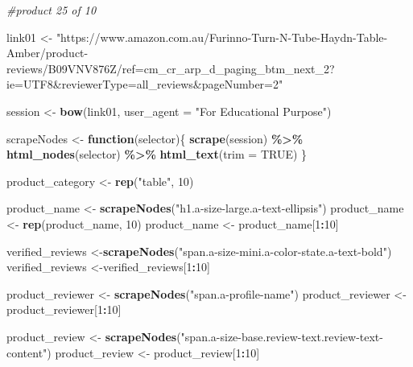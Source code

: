 \documentclass[
]{article}
\newenvironment{Shaded}{\begin{snugshade}}{\end{snugshade}}
\newcommand{\AttributeTok}[1]{\textcolor[rgb]{0.13,0.29,0.53}{#1}}
\newcommand{\CommentTok}[1]{\textcolor[rgb]{0.56,0.35,0.01}{\textit{#1}}}
\newcommand{\ConstantTok}[1]{\textcolor[rgb]{0.56,0.35,0.01}{#1}}
\newcommand{\ControlFlowTok}[1]{\textcolor[rgb]{0.13,0.29,0.53}{\textbf{#1}}}
\newcommand{\DecValTok}[1]{\textcolor[rgb]{0.00,0.00,0.81}{#1}}
\newcommand{\FunctionTok}[1]{\textcolor[rgb]{0.13,0.29,0.53}{\textbf{#1}}}
\newcommand{\NormalTok}[1]{#1}
\newcommand{\OtherTok}[1]{\textcolor[rgb]{0.56,0.35,0.01}{#1}}
\newcommand{\SpecialCharTok}[1]{\textcolor[rgb]{0.81,0.36,0.00}{\textbf{#1}}}
\newcommand{\StringTok}[1]{\textcolor[rgb]{0.31,0.60,0.02}{#1}}
\begin{document}
\begin{Shaded}
\begin{Highlighting}[]
\CommentTok{\#product 25 of 10}

\NormalTok{link01 }\OtherTok{\textless{}{-}} \StringTok{"https://www.amazon.com.au/Furinno{-}Turn{-}N{-}Tube{-}Haydn{-}Table{-}Amber/product{-}reviews/B09VNV876Z/ref=cm\_cr\_arp\_d\_paging\_btm\_next\_2?ie=UTF8\&reviewerType=all\_reviews\&pageNumber=2"}


\NormalTok{  session }\OtherTok{\textless{}{-}} \FunctionTok{bow}\NormalTok{(link01,}
               \AttributeTok{user\_agent =} \StringTok{"For Educational Purpose"}\NormalTok{)}

\NormalTok{  scrapeNodes }\OtherTok{\textless{}{-}} \ControlFlowTok{function}\NormalTok{(selector)\{}
    \FunctionTok{scrape}\NormalTok{(session) }\SpecialCharTok{\%\textgreater{}\%}
      \FunctionTok{html\_nodes}\NormalTok{(selector) }\SpecialCharTok{\%\textgreater{}\%}
      \FunctionTok{html\_text}\NormalTok{(}\AttributeTok{trim =} \ConstantTok{TRUE}\NormalTok{)}
\NormalTok{  \}}

\NormalTok{  product\_category }\OtherTok{\textless{}{-}} \FunctionTok{rep}\NormalTok{(}\StringTok{"table"}\NormalTok{, }\DecValTok{10}\NormalTok{)}

\NormalTok{  product\_name }\OtherTok{\textless{}{-}} \FunctionTok{scrapeNodes}\NormalTok{(}\StringTok{"h1.a{-}size{-}large.a{-}text{-}ellipsis"}\NormalTok{)}
\NormalTok{  product\_name }\OtherTok{\textless{}{-}} \FunctionTok{rep}\NormalTok{(product\_name, }\DecValTok{10}\NormalTok{)}
\NormalTok{  product\_name }\OtherTok{\textless{}{-}}\NormalTok{ product\_name[}\DecValTok{1}\SpecialCharTok{:}\DecValTok{10}\NormalTok{]}
  
\NormalTok{  verified\_reviews }\OtherTok{\textless{}{-}}\FunctionTok{scrapeNodes}\NormalTok{(}\StringTok{"span.a{-}size{-}mini.a{-}color{-}state.a{-}text{-}bold"}\NormalTok{)}
\NormalTok{  verified\_reviews }\OtherTok{\textless{}{-}}\NormalTok{verified\_reviews[}\DecValTok{1}\SpecialCharTok{:}\DecValTok{10}\NormalTok{]}
  
\NormalTok{  product\_reviewer }\OtherTok{\textless{}{-}} \FunctionTok{scrapeNodes}\NormalTok{(}\StringTok{"span.a{-}profile{-}name"}\NormalTok{)}
\NormalTok{  product\_reviewer }\OtherTok{\textless{}{-}}\NormalTok{ product\_reviewer[}\DecValTok{1}\SpecialCharTok{:}\DecValTok{10}\NormalTok{]}
  
\NormalTok{  product\_review }\OtherTok{\textless{}{-}} \FunctionTok{scrapeNodes}\NormalTok{(}\StringTok{"span.a{-}size{-}base.review{-}text.review{-}text{-}content"}\NormalTok{)}
\NormalTok{  product\_review }\OtherTok{\textless{}{-}}\NormalTok{ product\_review[}\DecValTok{1}\SpecialCharTok{:}\DecValTok{10}\NormalTok{]}
  

\end{Highlighting}
\end{Shaded}
\end{document}
